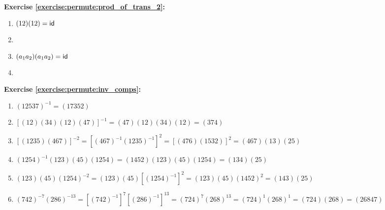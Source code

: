 \noindent\textbf{Exercise \ref{exercise:permute:prod_of_trans_2}:}
\begin{multicols}{2}
\begin{enumerate}[{a.}]
\item
$(12)(12) = \sf{id}$

\item

\item
$(a_1 a_2)(a_1 a_2) = \sf{id}$

\item
\end{enumerate}
\end{multicols}

\noindent\textbf{Exercise \ref{exercise:permute:inv_comps}:} %
\begin{enumerate}[{a.}]    
\item
$(12537)^{-1} = (17352)$

\item
$[(12)(34)(12)(47)]^{-1} = (47)(12)(34)(12) = (374)$

\item
$[(1235)(467)]^{-2} = [(467)^{-1}(1235)^{-1}]^2 = [(476)(1532)]^2 = (467)(13)(25)$

\item
$(1254)^{-1}(123)(45)(1254) = (1452)(123)(45)(1254) = (134)(25)$

\item
$(123)(45)(1254)^{-2} = (123)(45)[(1254)^{-1}]^{2} = (123)(45)(1452)^{2} =  (143)(25)$

\item
$(742)^{-7}(286)^{-13} = [(742)^{-1}]^{7}[(286)^{-1}]^{13} = (724)^{7}(268)^{13} = (724)^{1}(268)^{1} = (724)(268) = (26847)$
\end{enumerate}

